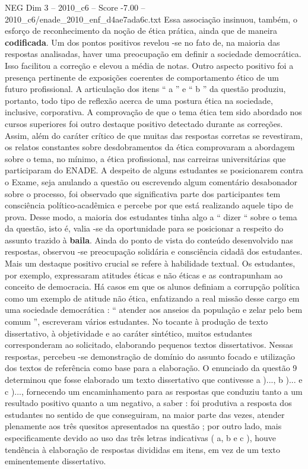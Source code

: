 \begin{textsample}{NEG Dim 3 – 2010\_c6 – Score -7.00 – 2010\_c6/enade\_2010\_enf\_d4ae7ada6c.txt}
Essa associação insinuou, também, o esforço de reconhecimento da noção de ética prática, ainda que de maneira \textbf{codificada}.
Um dos pontos positivos revelou -se no fato de, na maioria das respostas analisadas, haver uma preocupação em definir a sociedade democrática.
Isso facilitou a correção e elevou a média de notas.
Outro aspecto positivo foi a presença pertinente de exposições coerentes de comportamento ético de um futuro profissional.
A articulação dos itens “ a ” e “ b ” da questão produziu, portanto, todo tipo de reflexão acerca de uma postura ética na sociedade, inclusive, corporativa.
A comprovação de que o tema ética tem sido abordado nos cursos superiores foi outro destaque positivo detectado durante as correções.
Assim, além do caráter crítico de que muitas das respostas corretas se revestiram, os relatos constantes sobre desdobramentos da ética comprovaram a abordagem sobre o tema, no mínimo, a ética profissional, nas carreiras universitárias que participaram do ENADE.
A despeito de alguns estudantes se posicionarem contra o Exame, seja anulando a questão ou escrevendo algum comentário desabonador sobre o processo, foi observado que significativa parte dos participantes tem consciência político-acadêmica e percebe por que está realizando aquele tipo de prova.
Desse modo, a maioria dos estudantes tinha algo a “ dizer “ sobre o tema da questão, isto é, valia -se da oportunidade para se posicionar a respeito do assunto trazido à \textbf{baila}.
Ainda do ponto de vista do conteúdo desenvolvido nas respostas, observou -se preocupação solidária e consciência cidadã dos estudantes.
Mais um destaque positivo crucial se refere à habilidade textual.
Os estudantes, por exemplo, expressaram atitudes éticas e não éticas e as contrapunham ao conceito de democracia.
Há casos em que os alunos definiam a corrupção política como um exemplo de atitude não ética, enfatizando a real missão desse cargo em uma sociedade democrática : “ atender aos anseios da população e zelar pelo bem comum ”, escreveram vários estudantes.
No tocante à produção de texto dissertativo, à objetividade e ao caráter sintético, muitos estudantes corresponderam ao solicitado, elaborando pequenos textos dissertativos.
Nessas respostas, percebeu -se demonstração de domínio do assunto focado e utilização dos textos de referência como base para a elaboração.
O enunciado da questão 9 determinou que fosse elaborado um texto dissertativo que contivesse a )..., b )... e c )..., fornecendo um encaminhamento para as respostas que conduziu tanto a um resultado positivo quanto a um negativo, a saber : foi produtiva a resposta dos estudantes no sentido de que conseguiram, na maior parte das vezes, atender plenamente aos três quesitos apresentados na questão ; por outro lado, mais especificamente devido ao uso das três letras indicativas ( a, b e c ), houve tendência à elaboração de respostas divididas em itens, em vez de um texto eminentemente dissertativo.

\end{textsample}
